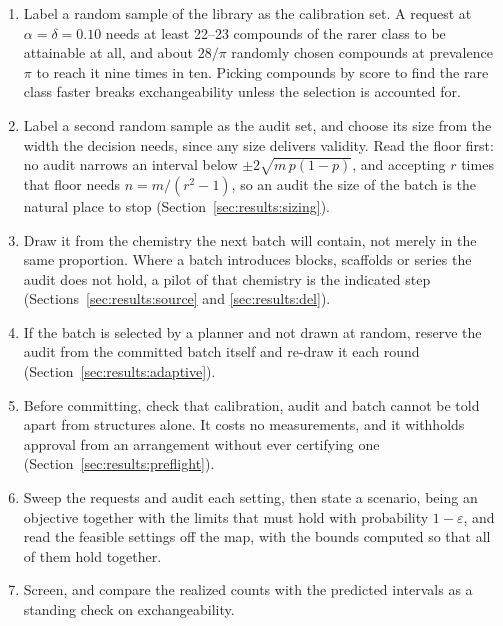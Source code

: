 \documentclass[twocolumn,10pt]{article}
\begin{document}
\begin{enumerate}\itemsep1pt
\item Label a random sample of the library as the calibration set. A request at
$\alpha=\delta=0.10$ needs at least 22--23 compounds of the rarer class to be attainable at all,
and about $28/\pi$ randomly chosen compounds at prevalence $\pi$ to reach it nine times in ten.
Picking compounds by score to find the rare class faster breaks exchangeability unless the
selection is accounted for.\citep{BarberBeyond2023}
\item Label a second random sample as the audit set, and choose its size from the width the decision needs, since any size delivers validity. Read the floor first: no audit
narrows an interval below $\pm2\sqrt{m\,p(1-p)}$, and accepting $r$ times that floor needs
$n=m/(r^2-1)$, so an audit the size of the batch is the natural place to stop
(Section~\ref{sec:results:sizing}).
\item Draw it from the chemistry the next batch will contain, not merely in the same proportion.
Where a batch introduces blocks, scaffolds or series the audit does not hold, a pilot of that
chemistry is the indicated step (Sections~\ref{sec:results:source} and \ref{sec:results:del}).
\item If the batch is selected by a planner and not drawn at random, reserve the audit from
the committed batch itself and re-draw it each round
(Section~\ref{sec:results:adaptive}).
\item Before committing, check that calibration, audit and batch cannot be told apart from
structures alone. It costs no measurements, and it withholds approval from an arrangement without ever certifying one (Section~\ref{sec:results:preflight}).
\item Sweep the requests and audit each setting, then state a scenario, being an objective together with the limits that must hold with probability $1-\varepsilon$, and read the feasible settings off the
map, with the bounds computed so that all of them hold together.
\item Screen, and compare the realized counts with the predicted intervals as a standing check on
exchangeability.
\end{enumerate}
\end{document}
